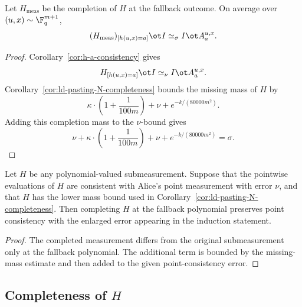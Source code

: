\begin{corollary}
	\label{cor:h-a-consistency-completed}
	\leanok
	Let $H_{\mathrm{meas}}$ be the completion of $H$ at the fallback outcome.
	On average over $(u,x) \sim \F_q^{m+1}$,
	\[
		(H_{\mathrm{meas}})_{[h(u,x)=a]} \ot I \simeq_{\sigma} I \ot A_a^{u,x}.
	\]
\end{corollary}
\begin{proof}
	\leanok
	Corollary~\ref{cor:h-a-consistency} gives
	\[
		H_{[h(u,x)=a]} \ot I \simeq_{\nu} I \ot A_a^{u,x}.
	\]
	Corollary~\ref{cor:ld-pasting-N-completeness} bounds the missing mass of $H$ by
	\[
		\kappa \cdot \left(1 + \frac{1}{100m}\right) + \nu + e^{-k/(80000m^2)}.
	\]
	Adding this completion mass to the $\nu$-bound gives
	\[
		\nu + \kappa \cdot \left(1 + \frac{1}{100m}\right) + \nu +
		e^{-k/(80000m^2)} = \sigma.
	\]
\end{proof}

\begin{lemma}
	\label{lem:h-a-consistency-completed-from-submeas}
	\leanok
	Let $H$ be any polynomial-valued submeasurement. Suppose that the pointwise
	evaluations of $H$ are consistent with Alice's point measurement with error
	$\nu$, and that $H$ has the lower mass bound used in
	Corollary~\ref{cor:ld-pasting-N-completeness}. Then completing $H$ at the
	fallback polynomial preserves point consistency with the enlarged error
	appearing in the induction statement.
\end{lemma}
\begin{proof}
	\leanok
	The completed measurement differs from the original submeasurement only at
	the fallback polynomial.  The additional term is bounded by the missing-mass
	estimate and then added to the given point-consistency error.
\end{proof}

\subsection{Completeness of $H$}
\label{sec:completeness-of-h-low-degree}

